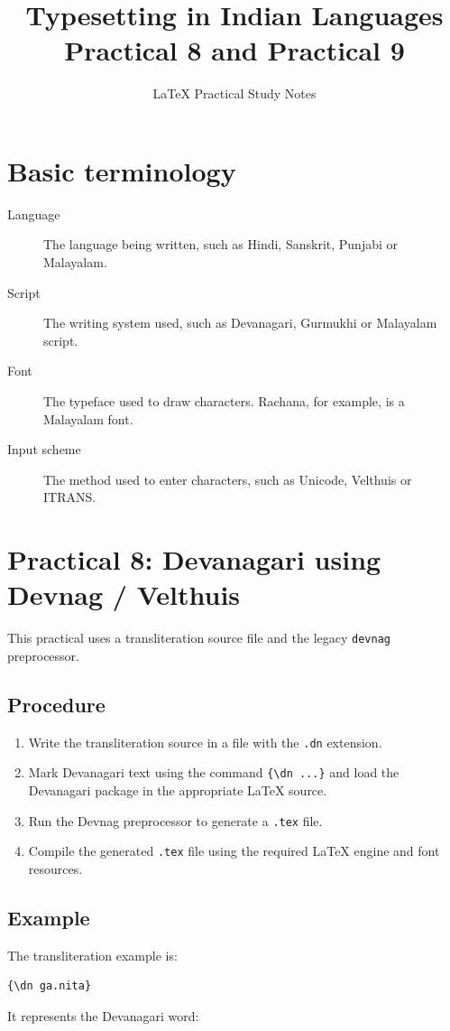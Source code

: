 \documentclass[12pt,a4paper]{article}
\title{Typesetting in Indian Languages\\\large Practical 8 and Practical 9}
\author{LaTeX Practical Study Notes}
\date{ }
\begin{document}
\maketitle
\tableofcontents
\newpage

\section{Basic terminology}
\begin{description}
  \item[Language] The language being written, such as Hindi, Sanskrit, Punjabi or Malayalam.
  \item[Script] The writing system used, such as Devanagari, Gurmukhi or Malayalam script.
  \item[Font] The typeface used to draw characters. Rachana, for example, is a Malayalam font.
  \item[Input scheme] The method used to enter characters, such as Unicode, Velthuis or ITRANS.
\end{description}

\section{Practical 8: Devanagari using Devnag / Velthuis}
This practical uses a transliteration source file and the legacy \texttt{devnag} preprocessor.

\subsection{Procedure}
\begin{enumerate}
  \item Write the transliteration source in a file with the \texttt{.dn} extension.
  \item Mark Devanagari text using the command \verb|{\dn ...}| and load the Devanagari package in the appropriate LaTeX source.
  \item Run the Devnag preprocessor to generate a \texttt{.tex} file.
  \item Compile the generated \texttt{.tex} file using the required LaTeX engine and font resources.
\end{enumerate}

\subsection{Example}
The transliteration example is:
\begin{verbatim}
{\dn ga.nita}
\end{verbatim}
It represents the Devanagari word:
\end{document}
